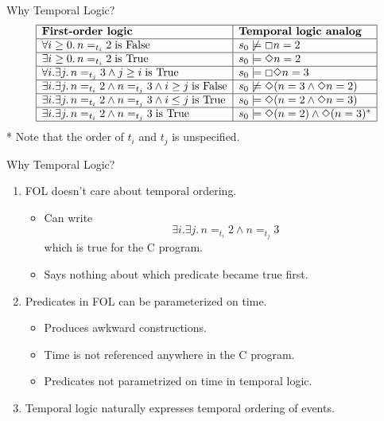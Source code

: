 \begin{wideslide}[bm=,toc=]{Why Temporal Logic?}
\begin{displaymath}
\begin{array}{|l|l|}
\hline
\mbox{\bf First-order logic} & \mbox{\bf Temporal logic analog} \\\hline
\forall i\geq 0.\, n=_{t_i}2\;\mbox{\rm is False} & s_0\not\models\Box n = 2\\\hline 
\exists i\geq 0.\, n=_{t_i}2\;\mbox{\rm is True}  & s_0\models\Diamond n = 2\\\hline
\forall i.\exists j.\, n=_{t_j}3 \wedge j\geq i\;\mbox{\rm is True} & s_0\models\Box\Diamond n = 3\\\hline
\exists i.\exists j.\, n =_{t_i}2 \wedge n=_{t_j}3 \wedge i \geq j\;\mbox{\rm is False} & 
s_0\not\models\Diamond (n = 3\wedge\Diamond n = 2)\\\hline
\exists i.\exists j.\, n =_{t_i}2 \wedge n=_{t_j}3 \wedge i \leq j\;\mbox{\rm is True} & 
s_0\models\Diamond (n = 2\wedge\Diamond n = 3)\\\hline
\exists i.\exists j.\, n =_{t_i}2 \wedge n=_{t_j}3\;\mbox{\rm is True} & s_0\models
\Diamond (n = 2) \land \Diamond (n = 3)^*\\\hline
\end{array}
\end{displaymath}
* Note that the order of $t_i$ and $t_j$ is unspecified.
\end{wideslide}

\begin{wideslide}[bm=,toc=]{Why Temporal Logic?}
\begin{enumerate}
\item<1-> FOL doesn't care about temporal ordering.  
\begin{itemize}
\item<2-> Can write
\begin{displaymath}
\exists i.\exists j.\, n =_{t_i}2 \wedge n=_{t_j}3
\end{displaymath}
which is true for the C program.
\item<2-> Says nothing about which predicate became true first.
\end{itemize}
\item<3-> Predicates in FOL can be parameterized on time.
\begin{itemize}
\item<4-> Produces awkward constructions.
\item<4-> Time is not referenced anywhere in the C program.
\item<4-> Predicates not parametrized on time in temporal logic.
\end{itemize}
\item<5-> Temporal logic naturally expresses temporal ordering of events.
\end{enumerate}
\end{wideslide}
